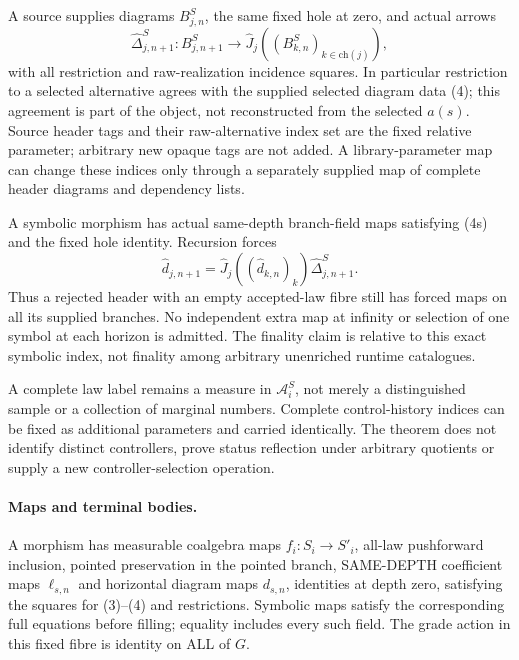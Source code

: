 \documentclass[11pt]{article}
\begin{document}
A source supplies diagrams $B^S_{j,n}$, the same fixed hole at zero, and actual arrows
\[
 \widehat\Delta^S_{j,n+1}: B^S_{j,n+1}\longrightarrow
 \widehat J_j((B^S_{k,n})_{k\in\mathrm{ch}(j)}),             \tag{4s}
\]
with all restriction and raw-realization incidence squares. In particular restriction to a selected alternative agrees with the supplied selected diagram data (4); this agreement is part of the object, not reconstructed from the selected $a(s)$. Source header tags and their raw-alternative index set are the fixed relative parameter; arbitrary new opaque tags are not added. A library-parameter map can change these indices only through a separately supplied map of complete header diagrams and dependency lists.

A symbolic morphism has actual same-depth branch-field maps satisfying (4s) and the fixed hole identity. Recursion forces
\[
 \widehat d_{j,n+1}=\widehat J_j((\widehat d_{k,n})_k)
                   \widehat\Delta^S_{j,n+1}.              \tag{4t}
\]
Thus a rejected header with an empty accepted-law fibre still has forced maps on all its supplied branches. No independent extra map at infinity or selection of one symbol at each horizon is admitted. The finality claim is relative to this exact symbolic index, not finality among arbitrary unenriched runtime catalogues.

A complete law label remains a measure in $\mathcal A^S_i$, not merely a distinguished sample or a collection of marginal numbers. Complete control-history indices can be fixed as additional parameters and carried identically. The theorem does not identify distinct controllers, prove status reflection under arbitrary quotients or supply a new controller-selection operation.

\paragraph{Maps and terminal bodies.}
A morphism has measurable coalgebra maps $f_i:S_i\to S'_i$, all-law pushforward inclusion, pointed preservation in the pointed branch, SAME-DEPTH coefficient maps $\ell_{s,n}$ and horizontal diagram maps $d_{s,n}$, identities at depth zero, satisfying the squares for (3)--(4) and restrictions. Symbolic maps satisfy the corresponding full equations before filling; equality includes every such field. The grade action in this fixed fibre is identity on ALL of $G$.
\end{document}
